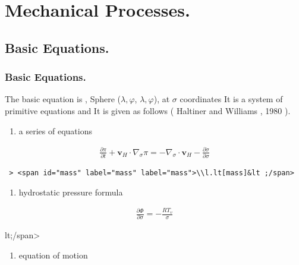 \hypertarget{mechanical-processes.}{%
\section{Mechanical Processes.}\label{mechanical-processes.}}

\hypertarget{basic-equations.}{%
\subsection{Basic Equations.}\label{basic-equations.}}

\hypertarget{basic-equations.-1}{%
\subsubsection{Basic Equations.}\label{basic-equations.-1}}

The basic equation is , Sphere (\(\lambda,\varphi\),
\(\lambda,\varphi\)), at \(\sigma\) coordinates It is a system of
primitive equations and It is given as follows ( Haltiner and Williams ,
1980 ).

\begin{enumerate}
\def\labelenumi{\arabic{enumi}.}
\tightlist
\item
  a series of equations
\end{enumerate}

\begin{eqnarray}
  \frac{\partial \pi}{\partial t}
    + \mathbf{v}_{H} \cdot \nabla_{\sigma} \pi
     =  - \nabla_{\sigma} \cdot \mathbf{v}_{H}
          - \frac{\partial \dot{\sigma}}{\partial \sigma}
\end{eqnarray}

\begin{verbatim}
 > <span id="mass" label="mass" label="mass">\\l.lt[mass]&lt ;/span>
\end{verbatim}

\begin{enumerate}
\def\labelenumi{\arabic{enumi}.}
\setcounter{enumi}{1}
\tightlist
\item
  hydrostatic pressure formula
\end{enumerate}

\begin{eqnarray}
  \frac{\partial \Phi}{\partial \sigma} = - \frac{RT_v}{\sigma}
\end{eqnarray}

lt;/span\textgreater{}

\begin{enumerate}
\def\labelenumi{\arabic{enumi}.}
\setcounter{enumi}{2}
\tightlist
\item
  equation of motion
\end{enumerate}

